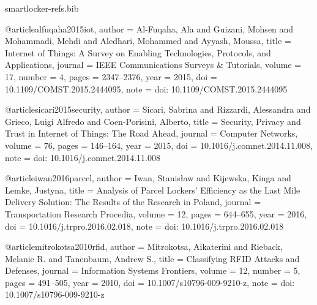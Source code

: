 \begin{filecontents*}[overwrite]{smartlocker-refs.bib}
%

@article{alfuqaha2015iot,
  author  = {Al-Fuqaha, Ala and Guizani, Mohsen and Mohammadi, Mehdi and Aledhari, Mohammed and Ayyash, Moussa},
  title   = {Internet of Things: A Survey on Enabling Technologies, Protocols, and Applications},
  journal = {IEEE Communications Surveys \& Tutorials},
  volume  = {17},
  number  = {4},
  pages   = {2347--2376},
  year    = {2015},
  doi     = {10.1109/COMST.2015.2444095},
  note    = {doi: 10.1109/COMST.2015.2444095}
}

@article{sicari2015security,
  author  = {Sicari, Sabrina and Rizzardi, Alessandra and Grieco, Luigi Alfredo and Coen-Porisini, Alberto},
  title   = {Security, Privacy and Trust in {Internet of Things}: The Road Ahead},
  journal = {Computer Networks},
  volume  = {76},
  pages   = {146--164},
  year    = {2015},
  doi     = {10.1016/j.comnet.2014.11.008},
  note    = {doi: 10.1016/j.comnet.2014.11.008}
}

@article{iwan2016parcel,
  author  = {Iwan, Stanis{\l}aw and Kijewska, Kinga and Lemke, Justyna},
  title   = {Analysis of Parcel Lockers' Efficiency as the Last Mile Delivery Solution: The Results of the Research in {Poland}},
  journal = {Transportation Research Procedia},
  volume  = {12},
  pages   = {644--655},
  year    = {2016},
  doi     = {10.1016/j.trpro.2016.02.018},
  note    = {doi: 10.1016/j.trpro.2016.02.018}
}

@article{mitrokotsa2010rfid,
  author  = {Mitrokotsa, Aikaterini and Rieback, Melanie R. and Tanenbaum, Andrew S.},
  title   = {Classifying {RFID} Attacks and Defenses},
  journal = {Information Systems Frontiers},
  volume  = {12},
  number  = {5},
  pages   = {491--505},
  year    = {2010},
  doi     = {10.1007/s10796-009-9210-z},
  note    = {doi: 10.1007/s10796-009-9210-z}
}


\end{filecontents*}

